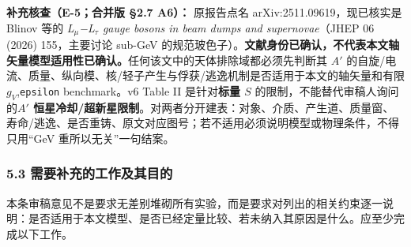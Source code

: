 \documentclass[
  chinese,
  UTF8]{ctexart}
\begin{document}
\textbf{补充核查（E-5；合并版 §2.7 A6）：} 原报告点名
arXiv:2511.09619，现已核实是 Blinov 等的 \emph{L\(_\mu\)−L\(_\tau\)
gauge bosons in beam dumps and supernovae}（JHEP 06 (2026) 155，主要讨论
sub-GeV
的规范玻色子）。\textbf{文献身份已确认，不代表本文轴矢量模型适用性已确认。}任何该文中的天体排除域都必须先判断其
\(A'\)
的自旋/电流、质量、纵向模、核/轻子产生与俘获/逃逸机制是否适用于本文的轴矢量和有限
\(g_V\),\texttt{epsilon} benchmark。v6 Table II 是针对\textbf{标量
\(S\)} 的限制，不能替代审稿人询问的\textbf{\(A'\)
恒星冷却/超新星限制}。对两者分开建表：对象、介质、产生道、质量窗、寿命/逃逸、是否重铸、原文对应图号；若不适用必须说明模型或物理条件，不得只用``GeV
重所以无关''一句结案。

\subsubsection{5.3 需要补充的工作及其目的}\label{major-4-step-3}

本条审稿意见不是要求无差别堆砌所有实验，而是要求对列出的相关约束逐一说明：是否适用于本文模型、是否已经定量比较、若未纳入其原因是什么。应至少完成以下工作。
\end{document}
